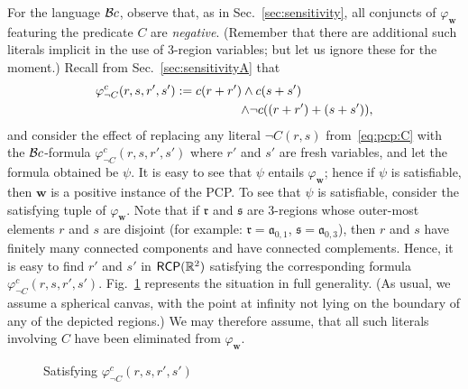 \documentclass{article}
\newcommand{\R}{\mathbb{R}}
\newcommand{\RCP}{{\sf RCP}}
\newcommand{\fW}{\mathbf{w}}
\newcommand{\tseq}[1]{\mathfrak{#1}}
\renewcommand{\phi}{\varphi}
\begin{document}
For the language $\mathcal{B}c$, observe that, as in Sec.~\ref{sec:sensitivity},  
all conjuncts of $\phi_\fW$ featuring the predicate $C$ are {\em negative}. 
(Remember that there are additional such literals
implicit in the use of 3-region variables; but let us ignore these for
the moment.) Recall from Sec.~\ref{sec:sensitivityA} that
\begin{align*}
	\phi_{\lnot C}^c(r,s,r',s'):=c(r+r')\land c(s+s') \hspace{2cm}
		\\\hfill\land \lnot c((r+r')+(s+s')),
\end{align*}
and consider the effect of replacing any literal $\neg C(r,s)$
from~\eqref{eq:pcp:C} with the $\mathcal{B}c$-formula $\phi_{\lnot
  C}^c(r,s,r',s')$ where $r'$ and $s'$ are fresh variables, and let
the formula obtained be $\psi$. It is easy to see that $\psi$ entails
$\phi_\fW$; hence if $\psi$ is satisfiable, then $\fW$ is a positive
instance of the PCP.  To see that $\psi$ is satisfiable, consider the
satisfying tuple of $\phi_\fW$. Note that if $\tseq{r}$ and $\tseq{s}$
are 3-regions whose outer-most elements $r$ and $s$ are disjoint (for
example: $\tseq{r} = \tseq{a}_{0,1}$, $\tseq{s} = \tseq{a}_{0,3}$),
then $r$ and $s$ have finitely many connected components and have
connected complements. Hence, it is easy to find $r'$ and $s'$ in
$\RCP(\R^2)$ satisfying the corresponding formula $\phi_{\lnot
  C}^c(r,s,r',s')$.  Fig.~\ref{fig:connectingRsAndSs} represents the
situation in full generality. (As usual, we assume a spherical
canvas, with the point at infinity not lying on the
boundary of any of the depicted regions.)  We may therefore assume,
that all such literals involving $C$ have been eliminated from
$\phi_\fW$.

\begin{figure}[h]
	\begin{center}
	\end{center}
	\caption{Satisfying $\phi_{\lnot C}^c(r,s,r',s')$}
	\label{fig:connectingRsAndSs}
\end{figure}
\end{document}
